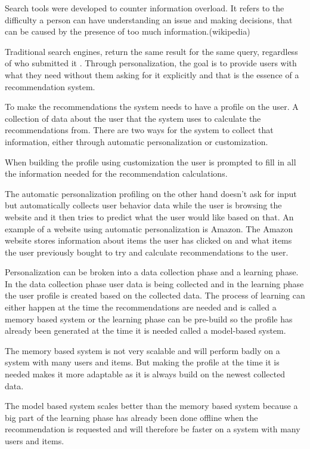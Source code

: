 Search tools were developed to counter information overload. It refers to the difficulty a person can have understanding an issue and making decisions, that can be caused by the presence of too much information.(wikipedia)

Traditional search engines, return the same result for the same query, regardless of who submitted it \cite{TheAdaptiveWeb}. Through personalization, the goal is to provide users with what they need without them asking for it explicitly and that is the essence of a recommendation system.

To make the recommendations the system needs to have a profile on the user. A collection of data about the user that the system uses to calculate the recommendations from. There are two ways for the system to collect that information, either through automatic personalization or customization.

When building the profile using customization the user is prompted to fill in all the information needed for the recommendation calculations.

The automatic personalization profiling on the other hand doesn't ask for input but automatically collects user behavior data while the user is browsing the website and it then tries to predict what the user would like based on that. An example of a website using automatic personalization is Amazon. The Amazon website stores information about items the user has clicked on and what items the user previously bought to try and calculate recommendations to the user. 	
   
Personalization can be broken into a data collection phase and a learning phase. In the data collection phase user data is being collected and in the learning phase the user profile is created based on the collected data. The process of learning can either happen at the time the recommendations are needed and is called a memory based system or the learning phase can be pre-build so the profile has already been generated at the time it is needed called a model-based system.	

The memory based system is not very scalable and will perform badly on a system with many users and items. But making the profile at the time it is needed makes it more adaptable as it is always build on the newest collected data.

The model based system scales better than the memory based system because a big part of the learning phase has already been done offline when the recommendation is requested and will therefore be faster on a system with many users and items. 
